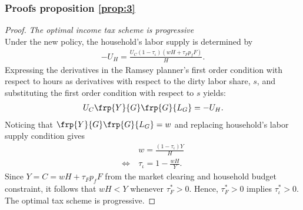 \subsubsection{Proofs proposition \ref{prop:3}}\label{app:proofintegrated}
\begin{proof} \textit{The optimal income tax scheme is progressive}\\ %
	Under the new policy, the household's labor supply is determined by
	\begin{align}
	-U_H=\frac{U_C (1-\tau_{\iota})(wH+\tau_F p_fF)}{H}.
	\end{align}
	Expressing the derivatives in the Ramsey planner's first order condition with respect to hours as derivatives with respect to the dirty labor share, $s$, and substituting the first order condition with respect to $s$ yields:
	\begin{align}
	U_C \frp{Y}{G}\frp{G}{L_G}=-U_H.
	\end{align}
	Noticing that $\frp{Y}{G}\frp{G}{L_G}=w$ and replacing household's labor supply condition gives
	\begin{align}
	& w=\frac{(1-\tau_\iota)Y}{H}\\
	\Leftrightarrow\ & \tau_\iota=1-\frac{wH}{Y}. 
	\end{align} 
	Since $Y=C=wH+\tau_Fp_fF$ from the market clearing and household budget constraint, it follows that $wH<Y$ whenever $\tau^*_F>0$. Hence, $\tau_F^*>0$ implies $\tau^*_{\iota}>0$.
	The optimal tax scheme is progressive.
\end{proof}

